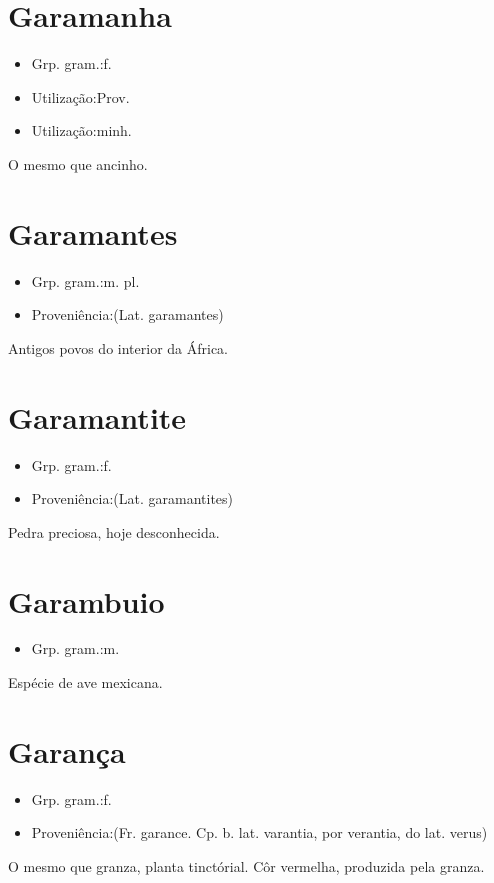 \section{Garamanha}
\begin{itemize}
\item {Grp. gram.:f.}
\end{itemize}
\begin{itemize}
\item {Utilização:Prov.}
\end{itemize}
\begin{itemize}
\item {Utilização:minh.}
\end{itemize}
O mesmo que \textunderscore ancinho\textunderscore .
\section{Garamantes}
\begin{itemize}
\item {Grp. gram.:m. pl.}
\end{itemize}
\begin{itemize}
\item {Proveniência:(Lat. \textunderscore garamantes\textunderscore )}
\end{itemize}
Antigos povos do interior da África.
\section{Garamantite}
\begin{itemize}
\item {Grp. gram.:f.}
\end{itemize}
\begin{itemize}
\item {Proveniência:(Lat. \textunderscore garamantites\textunderscore )}
\end{itemize}
Pedra preciosa, hoje desconhecida.
\section{Garambuio}
\begin{itemize}
\item {Grp. gram.:m.}
\end{itemize}
Espécie de ave mexicana.
\section{Garança}
\begin{itemize}
\item {Grp. gram.:f.}
\end{itemize}
\begin{itemize}
\item {Proveniência:(Fr. \textunderscore garance\textunderscore . Cp. b. lat. \textunderscore varantia\textunderscore , por \textunderscore verantia\textunderscore , do lat. \textunderscore verus\textunderscore )}
\end{itemize}
O mesmo que \textunderscore granza\textunderscore , planta tinctórial.
Côr vermelha, produzida pela granza.
